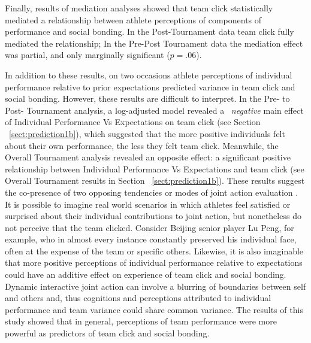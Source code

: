 \begin{CJK}{UTF8}{gbsn}

Finally, results of mediation analyses showed that team click statistically mediated a relationship between athlete perceptions of components of performance and social bonding. In the Post-Tournament data team click fully mediated the relationship; In the Pre-Post Tournament data the mediation effect was partial, and only marginally significant ($p = .06$).

In addition to these results, on two occasions athlete perceptions of individual performance relative to prior expectations predicted variance in team click and social bonding. However, these results are difficult to interpret.  In the Pre- to Post- Tournament analysis, a log-adjusted model revealed a ~\textit{negative} main effect of Individual Performance Vs Expectations on team click (see Section ~\ref{sect:prediction1b}), which suggested that the more positive individuals felt about their own performance, the less they felt team click. Meanwhile, the Overall Tournament analysis revealed an opposite effect: a significant positive relationship between Individual Performance Vs Expectations and team click (see Overall Tournament results in Section ~\ref{sect:prediction1b}). These results suggest the co-presence of two opposing tendencies or modes of joint action evaluation \citep{Friston2015a}. It is possible to imagine real world scenarios in which athletes feel satisfied or surprised about their individual contributions to joint action, but nonetheless do not perceive that the team clicked.  Consider Beijing senior player Lu Peng, for example, who in almost every instance constantly preserved his individual face, often at the expense of the team or specific others.  Likewise, it is also imaginable that more positive perceptions of individual performance relative to expectations could have an additive effect on experience of team click and social bonding.  Dynamic interactive joint action can involve a blurring of boundaries between self and others and, thus cognitions and perceptions attributed to individual performance and team variance could share common variance.  The results of this study showed that in general, perceptions of team performance were more powerful as predictors of team click and social bonding.




\end{CJK}
